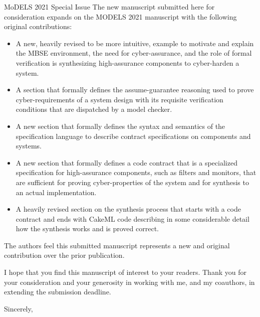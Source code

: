 \documentclass[10pt]{byu-cs}
\begin{document}
\begin{letter}{MoDELS 2021 Special Issue}
The new manuscript submitted here for consideration expands on the MODELS 2021 manuscript with the following original contributions:
\begin{itemize}
    \item A new, heavily revised to be more intuitive, example to motivate and explain the MBSE environment, the need for cyber-assurance, and the role of formal verification is synthesizing high-assurance components to cyber-harden a system.
    \item A section that formally defines the assume-guarantee reasoning used to prove cyber-requirements of a system design with its requisite verification conditions that are dispatched by a model checker.
    \item A new section that formally defines the syntax and semantics of the specification language to describe contract specifications on components and systems.
    \item A new section that formally defines a code contract that is a specialized specification for high-assurance components, such as filters and monitors, that are sufficient for proving cyber-properties of the system and for synthesis to an actual implementation.
    \item A heavily revised section on the synthesis process that starts with a code contract and ends with CakeML code describing in some considerable detail how the synthesis works and is proved correct.
\end{itemize} 
The authors feel this submitted manuscript represents a new and original contribution over the prior publication.

I hope that you find this manuscript of interest to your readers. Thank you for your consideration and your generosity in working with me, and my coauthors, in extending the submission deadline.

\closing{Sincerely,}

\end{letter}
\end{document}
